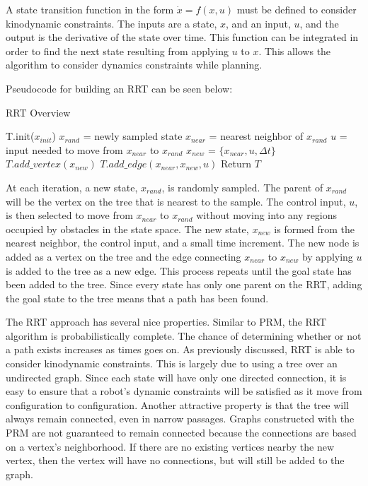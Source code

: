 \documentclass[10pt,conference]{ieeeconf}
\begin{document}
A state transition function in the form $\dot{x} = f(x,u)$ must be defined to consider kinodynamic constraints. The inputs are a state, $x$, and an input, $u$, and the output is the derivative of the state over time. This function can be integrated in order to find the next state resulting from applying $u$ to $x$. This allows the algorithm to consider dynamics constraints while planning. 

Pseudocode for building an RRT can be seen below:

\begin{algorithm}
\caption{RRT Overview}
\begin{algorithmic}[1]
\State T.init($x_{init}$)
\State $x_{rand}$ = newly sampled state
\State $x_{near}$ = nearest neighbor of $x_{rand}$
\State $u$ = input needed to move from $x_{near}$ to $x_{rand}$
\State $x_{new}$ = $\{x_{near}, u, \Delta t\}$
\State $T.add\_vertex(x_{new})$
\State $T.add\_edge(x_{near}, x_{new}, u)$
\EndWhile
\State Return $T$
\EndFunction
\end{algorithmic}
\end{algorithm}

At each iteration, a new state, $x_{rand}$, is randomly sampled. The parent of $x_{rand}$ will be the vertex on the tree that is nearest to the sample. The control input, $u$, is then selected to move from $x_{near}$ to $x_{rand}$ without moving into any regions occupied by obstacles in the state space. The new state, $x_{new}$ is formed from the nearest neighbor, the control input, and a small time increment. The new node is added as a vertex on the tree and the edge connecting $x_{near}$ to $x_{new}$ by applying $u$ is added to the tree as a new edge. This process repeats until the goal state has been added to the tree. Since every state has only one parent on the RRT, adding the goal state to the tree means that a path has been found. 

The RRT approach has several nice properties. Similar to PRM, the RRT algorithm is probabilistically complete. The chance of determining whether or not a path exists increases as times goes on. As previously discussed, RRT is able to consider kinodynamic constraints. This is largely due to using a tree over an undirected graph. Since each state will have only one directed connection, it is easy to ensure that a robot's dynamic constraints will be satisfied as it move from configuration to configuration. Another attractive property is that the tree will always remain connected, even in narrow passages. Graphs constructed with the PRM are not guaranteed to remain connected because the connections are based on a vertex's neighborhood. If there are no existing vertices nearby the new vertex, then the vertex will have no connections, but will still be added to the graph.
\end{document}
